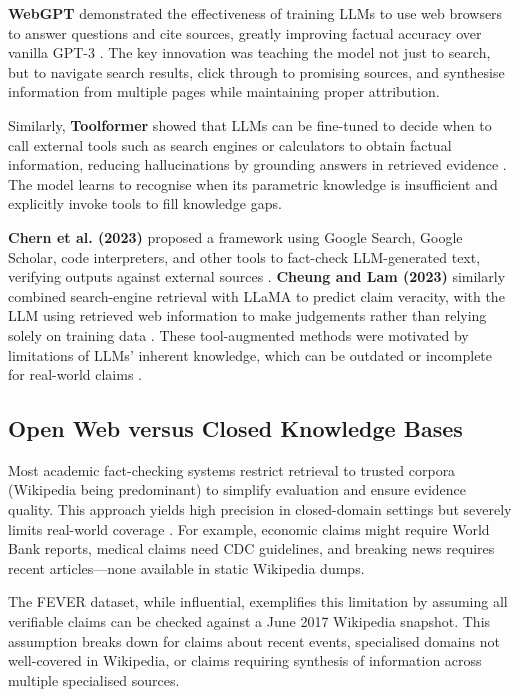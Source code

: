 \documentclass[12pt,a4paper]{article}
\begin{document}
\textbf{WebGPT} demonstrated the effectiveness of training LLMs to use web browsers to answer questions and cite sources, greatly improving factual accuracy over vanilla GPT-3 \citep{nakano2022webgpt}. The key innovation was teaching the model not just to search, but to navigate search results, click through to promising sources, and synthesise information from multiple pages while maintaining proper attribution.

Similarly, \textbf{Toolformer} showed that LLMs can be fine-tuned to decide when to call external tools such as search engines or calculators to obtain factual information, reducing hallucinations by grounding answers in retrieved evidence \citep{schick2023toolformer}. The model learns to recognise when its parametric knowledge is insufficient and explicitly invoke tools to fill knowledge gaps.

\textbf{Chern et al. (2023)} proposed a framework using Google Search, Google Scholar, code interpreters, and other tools to fact-check LLM-generated text, verifying outputs against external sources \citep{chern2023framework}. \textbf{Cheung and Lam (2023)} similarly combined search-engine retrieval with LLaMA to predict claim veracity, with the LLM using retrieved web information to make judgements rather than relying solely on training data \citep{cheung2023llmfactcheck}. These tool-augmented methods were motivated by limitations of LLMs' inherent knowledge, which can be outdated or incomplete for real-world claims \citep{chern2023framework}.

\subsection{Open Web versus Closed Knowledge Bases}

Most academic fact-checking systems restrict retrieval to trusted corpora (Wikipedia being predominant) to simplify evaluation and ensure evidence quality. This approach yields high precision in closed-domain settings but severely limits real-world coverage \citep{gao2023rarr}. For example, economic claims might require World Bank reports, medical claims need CDC guidelines, and breaking news requires recent articles—none available in static Wikipedia dumps.

The FEVER dataset, while influential, exemplifies this limitation by assuming all verifiable claims can be checked against a June 2017 Wikipedia snapshot. This assumption breaks down for claims about recent events, specialised domains not well-covered in Wikipedia, or claims requiring synthesis of information across multiple specialised sources.
\end{document}
